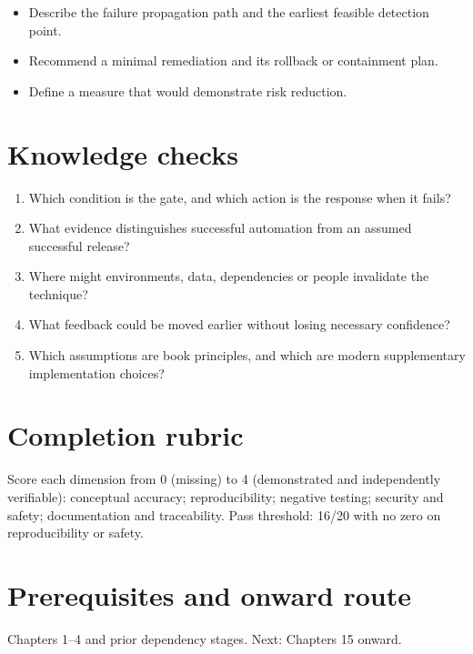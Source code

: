 \documentclass[10pt,letterpaper]{article}
\begin{document}
\begin{itemize}
\item Describe the failure propagation path and the earliest feasible detection point.
\item Recommend a minimal remediation and its rollback or containment plan.
\item Define a measure that would demonstrate risk reduction.
\end{itemize}

\section{Knowledge checks}
\begin{enumerate}
\item Which condition is the gate, and which action is the response when it fails?
\item What evidence distinguishes successful automation from an assumed successful release?
\item Where might environments, data, dependencies or people invalidate the technique?
\item What feedback could be moved earlier without losing necessary confidence?
\item Which assumptions are book principles, and which are modern supplementary implementation choices?
\end{enumerate}

\section{Completion rubric}
Score each dimension from 0 (missing) to 4 (demonstrated and independently verifiable): conceptual accuracy; reproducibility; negative testing; security and safety; documentation and traceability. Pass threshold: 16/20 with no zero on reproducibility or safety.


\section{Prerequisites and onward route}
Chapters 1--4 and prior dependency stages. Next: Chapters 15 onward.
\end{document}
